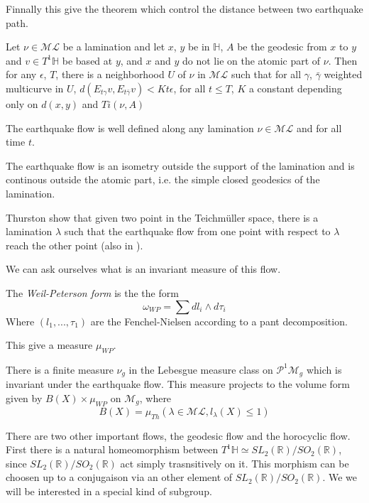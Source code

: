Finnally this give the theorem which control the distance between two earthquake path.

\begin{prop}
Let $\nu \in \mathcal{ML}$ be a lamination and let $x$, $y$ be in $\mathbb{H}$, $A$ be the geodesic from $x$ to $y$ and $v\in T^1 \mathbb{H}$ be based at $y$, and $x$ and $y$ do not lie on the atomic part of $\nu$. Then for any $\epsilon$, $T$, there is a neighborhood $U$ of $\nu$ in $\mathcal{ML}$ such that for all
$\gamma$, $\bar{\gamma}$ weighted multicurve in $U$, $d(E_{t \gamma}v,E_{t \bar{\gamma}}v) < K t \epsilon$, for all $t \leq T$, $K$ a constant depending only on $d(x,y)$ and $T i(\nu,A)$
\end{prop}


\begin{cor}
The earthquake flow is well defined along any lamination $\nu \in \mathcal{ML}$ and for all time $t$.
\end{cor}

\begin{rmq}
The earthquake flow is an isometry outside the support of the lamination and is continous outside the atomic part, i.e. the simple closed geodesics of the lamination.
\end{rmq}

Thurston show that given two point in the Teichmüller space, there is a lamination $\lambda$ such that the earthquake flow from one point with respect to $\lambda$ reach the other point (also in \cite{NielsenRealizationPro}).

We can ask ourselves what is an invariant measure of this flow.

\begin{dfnt}
The \emph{Weil-Peterson form} is the the form \[
\omega_{WP} = \sum d l_i \wedge d \tau_i
\]
Where $(l_1,...,\tau_1)$ are the Fenchel-Nielsen according to a pant decomposition.

This give a measure $\mu_{WP}$.
\end{dfnt}

There is a finite measure $\nu_g$ in the Lebesgue measure class on $\mathcal{P}^1 \mathcal{M}_g$ which is invariant under the earthquake flow. This measure projects to the volume form given by $B(X) \times \mu_{WP}$ on $\mathcal{M}_g$, where \[
B(X)=\mu_{Th}(\lambda \in \mathcal{ML}, l_\lambda(X) \leq 1)
\]

There are two other important flows, the geodesic flow and the horocyclic flow.
First there is a natural homeomorphism between $T^1 \mathbb{H}  \simeq SL_2(\mathbb{R}) / SO_2(\mathbb{R})$, since $SL_2(\mathbb{R}) / SO_2(\mathbb{R})$ act simply trasnsitively on it. This morphism can be choosen up to a conjugaison via an other element of $SL_2(\mathbb{R}) / SO_2(\mathbb{R})$. We we will be interested in a special kind of subgroup.

